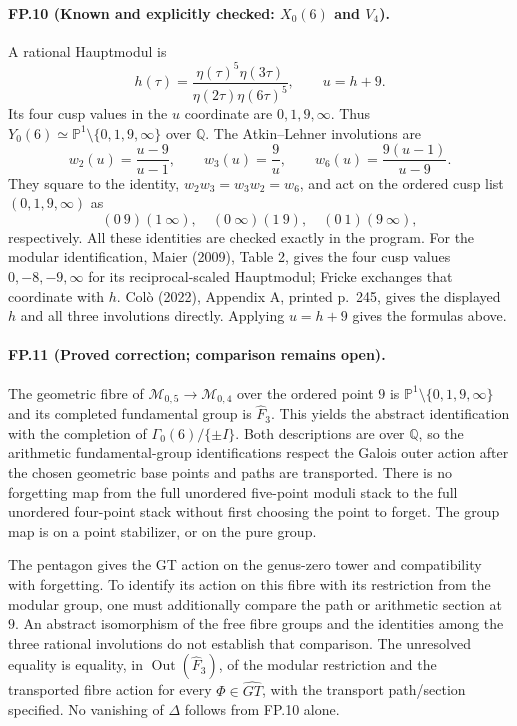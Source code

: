 \paragraph{FP.10 (Known and explicitly checked: $X_0(6)$ and $V_4$).}
A rational Hauptmodul is
\[
 h(\tau)=\frac{\eta(\tau)^5\eta(3\tau)}
 {\eta(2\tau)\eta(6\tau)^5},\qquad u=h+9.
\]
Its four cusp values in the $u$ coordinate are $0,1,9,\infty$.
Thus $Y_0(6)\simeq\mathbb P^1\setminus\{0,1,9,\infty\}$ over
$\mathbb Q$. The Atkin--Lehner involutions are
\[
 w_2(u)=\frac{u-9}{u-1},\qquad
 w_3(u)=\frac9u,\qquad
 w_6(u)=\frac{9(u-1)}{u-9}.
\]
They square to the identity, $w_2w_3=w_3w_2=w_6$, and act on the ordered
cusp list $(0,1,9,\infty)$ as
\[
 (0\ 9)(1\ \infty),\quad (0\ \infty)(1\ 9),\quad
 (0\ 1)(9\ \infty),
\]
respectively. All these identities are checked exactly in the program.
For the modular identification, Maier (2009), Table 2, gives the four
cusp values $0,-8,-9,\infty$ for its reciprocal-scaled Hauptmodul;
Fricke exchanges that coordinate with $h$. Col\`o (2022), Appendix A,
printed p.~245, gives the displayed $h$ and all three involutions directly.
Applying $u=h+9$ gives the formulas above.

\paragraph{FP.11 (Proved correction; comparison remains open).}
The geometric fibre of
$\mathcal M_{0,5}\to\mathcal M_{0,4}$ over the ordered point $9$ is
$\mathbb P^1\setminus\{0,1,9,\infty\}$ and its completed fundamental
group is $\widehat F_3$. This yields the abstract identification with the
completion of $\Gamma_0(6)/\{\pm I\}$. Both descriptions are over
$\mathbb Q$, so the arithmetic fundamental-group identifications respect
the Galois outer action after the chosen geometric base points and paths
are transported. There is no forgetting map from the full unordered
five-point moduli stack to the full unordered four-point stack without
first choosing the point to forget. The group map is on a point stabilizer,
or on the pure group.

The pentagon gives the GT action on the genus-zero tower and compatibility
with forgetting. To identify its action on this fibre with its restriction
from the modular group, one must additionally compare the path or
arithmetic section at $9$. An abstract isomorphism of the free fibre groups
and the identities among the three rational involutions do not establish
that comparison. The unresolved equality is equality, in
$\operatorname{Out}(\widehat F_3)$, of the modular restriction and the
transported fibre action for every $\Phi\in\widehat{GT}$, with the
transport path/section specified. No vanishing of $\Delta$ follows from
FP.10 alone.

